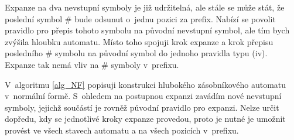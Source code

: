 Expanze na dva nevstupní symboly je již udržitelná, ale stále se může stát, že poslední symbol $\#$ bude odsunut o~jednu pozici za prefix. Nabízí se povolit pravidlo pro přepis tohoto symbolu na původní nevstupní symbol, ale tím bych zvýšila hloubku automatu. Místo toho spojuji krok expanze a krok přepisu posledního $\#$ symbolu na původní symbol do jednoho pravidla typu (iv). Expanze tak nemá vliv na $\#$ symboly v~prefixu.

V~algoritmu \ref{alg_NF} popisuji konstrukci hlubokého zásobníkového automatu v~normální formě. S~ohledem na postupnou expanzi zavádím nové nevstupní symboly, jejichž součástí je rovněž původní pravidlo pro expanzi. Nelze určit dopředu, kdy se jednotlivé kroky expanze provedou, proto je nutné je umožnit provést ve všech stavech automatu a na všech pozicích v~prefixu. 

